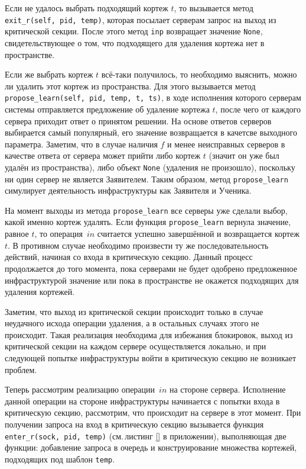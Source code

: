 Если не удалось выбрать подходящий кортеж $t$, то вызывается метод \texttt{exit_r(self, pid, temp)}, которая посылает серверам запрос на выход из критической секции. После этого метод \texttt{inp} возвращает значение \texttt{None}, свидетельствующее о том, что подходящего для удаления кортежа нет в пространстве.

Если же выбрать кортеж $t$ всё-таки получилось, то необходимо выяснить, можно ли удалить этот кортеж из пространства. Для этого вызывается метод \texttt{propose_learn(self, pid, temp, t, ts)}, в ходе исполнения которого серверам системы отправляется предложение об удаление кортежа $t$, после чего от каждого сервера приходит ответ о принятом решении. На основе ответов серверов выбирается самый популярный, его значение возвращается в качетсве выходного параметра. Заметим, что в случае наличия $f$ и менее неисправных серверов в качестве ответа от сервера может прийти либо кортеж $t$ (значит он уже был удалён из пространства), либо объект \texttt{None} (удаления не произошло), поскольку ни один сервер не является Заявителем. Таким образом, метод \texttt{propose_learn} симулирует деятельность инфраструктуры как Заявителя и Ученика.

На момент выходы из метода \texttt{propose_learn} все серверы уже сделали выбор, какой именно кортеж удалять. Если функция \texttt{propose_learn} вернула значение, равное $t$, то операция~$in$ считается успешно завершённой и возвращается кортеж $t$. В противном случае необходимо произвести ту же последовательность действий, начиная со входа в критическую секцию. Данный процесс продолжается до того момента, пока серверами не будет одобрено предложенное инфраструктурой значение или пока в пространстве не окажется подходящих для удаления кортежей.

Заметим, что выход из критической секции происходит только в случае неудачного исхода операции удаления, а в остальных случаях этого не происходит. Такая реализация необходима для избежания блокировок, выход из критической секции на каждом сервере осуществляется локально, и при следующей попытке инфраструктуры войти в критическую секцию не возникает проблем.

Теперь рассмотрим реализацию операции~$in$ на стороне сервера. Исполнение данной операции на стороне инфраструктуры начинается с попытки входа в критическую секцию, рассмотрим, что происходит на сервере в этот момент. При получении запроса на вход в критическую секцию вызывается функция \texttt{enter_r(sock, pid, temp)} (см.\,листинг \ref{} в приложении), выполняющая две функции: добавление запроса в очередь и конструирование множества кортежей, подходящих под шаблон \texttt{temp}.

